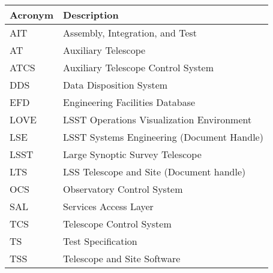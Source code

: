 \addtocounter{table}{-1}
\begin{longtable}{|l|p{}|}\hline
\textbf{Acronym} & \textbf{Description}  \\\hline

AIT & Assembly, Integration, and Test \\\hline
AT & Auxiliary Telescope \\\hline
ATCS & Auxiliary Telescope Control System \\\hline
DDS & Data Disposition System \\\hline
EFD & Engineering Facilities Database \\\hline
LOVE & LSST Operations Visualization Environment \\\hline
LSE & LSST Systems Engineering (Document Handle) \\\hline
LSST & Large Synoptic Survey Telescope \\\hline
LTS & LSS Telescope and Site (Document handle) \\\hline
OCS & Observatory Control System \\\hline
SAL & Services Access Layer \\\hline
TCS & Telescope Control System \\\hline
TS & Test Specification \\\hline
TSS & Telescope and Site Software \\\hline
\end{longtable}
